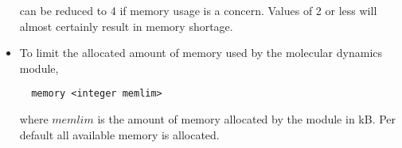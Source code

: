 \begin{itemize}
can be reduced to 4 if memory usage is a concern. Values of 2 or less
will almost certainly result in memory shortage.
\item
To limit the allocated amount of memory used by the molecular dynamics
module,
\begin{verbatim}
  memory <integer memlim>
\end{verbatim}
where $memlim$ is the amount of memory allocated by the module in
kB. Per default all available memory is allocated.
\end{itemize}





